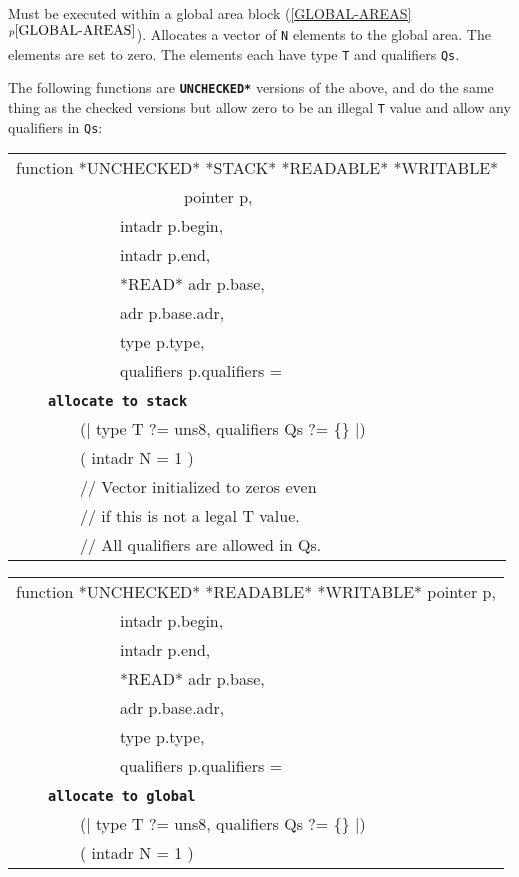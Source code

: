 \documentclass[12pt]{article}
\makeatletter
\newcommand{\TT}[1]{{\tt \bfseries #1}}
\newcommand{\ttkey}[1]{\TT{#1}\index{#1@{\tt #1}}}
\newcommand{\itemref}[1]{\ref{#1}$^{p\pageref{#1}}$}
\newenvironment{indpar}[1][0.3in]%
	{\begin{list}{}%
		     {\setlength{\itemsep}{0in}%
		      \setlength{\topsep}{0in}%
		      \setlength{\parsep}{1ex}%
		      \setlength{\labelwidth}{#1}%
		      \setlength{\leftmargin}{#1}%
		      \addtolength{\leftmargin}{\labelsep}}%
	 \item}%
	{\end{list}}
\makeatother
\begin{document}
\begin{indpar}
\begin{indpar}
Must be executed within a global area block (\itemref{GLOBAL-AREAS}).
Allocates a vector of {\tt N} elements to the global area.
The elements are set to zero.
The elements each have type {\tt T} and qualifiers {\tt Qs}.
\end{indpar}

\end{indpar}

The following functions are \TT{*UNCHECKED*} versions of the
above, and do the same thing as the checked versions but
allow zero to be an illegal {\tt T} value and allow any qualifiers
in {\tt Qs}:

\begin{indpar}

{\tt\begin{tabular}{@{}l}
function *UNCHECKED* *STACK* *READABLE* *WRITABLE* \\
~~~~~~~~~~~~~~~~~~~~~pointer p, \\
~~~~~~~~~~~~~intadr p.begin, \\
~~~~~~~~~~~~~intadr p.end, \\
~~~~~~~~~~~~~*READ* adr p.base, \\
~~~~~~~~~~~~~adr p.base.adr, \\
~~~~~~~~~~~~~type p.type, \\
~~~~~~~~~~~~~qualifiers p.qualifiers = \\
~~~~\ttkey{allocate to stack} \\
~~~~~~~~(| type T ?= uns8, qualifiers Qs ?= \{\} |) \\
~~~~~~~~( intadr N = 1 ) \\
~~~~~~~~// Vector initialized to zeros even \\
~~~~~~~~// if this is not a legal T value. \\
~~~~~~~~// All qualifiers are allowed in Qs. \\
\end{tabular}}

{\tt\begin{tabular}{@{}l}
function *UNCHECKED* *READABLE* *WRITABLE* pointer p, \\
~~~~~~~~~~~~~intadr p.begin, \\
~~~~~~~~~~~~~intadr p.end, \\
~~~~~~~~~~~~~*READ* adr p.base, \\
~~~~~~~~~~~~~adr p.base.adr, \\
~~~~~~~~~~~~~type p.type, \\
~~~~~~~~~~~~~qualifiers p.qualifiers = \\
~~~~\ttkey{allocate to global} \\
~~~~~~~~(| type T ?= uns8, qualifiers Qs ?= \{\} |) \\
~~~~~~~~( intadr N = 1 ) \\
\end{tabular}}

\end{indpar}
\end{document}
